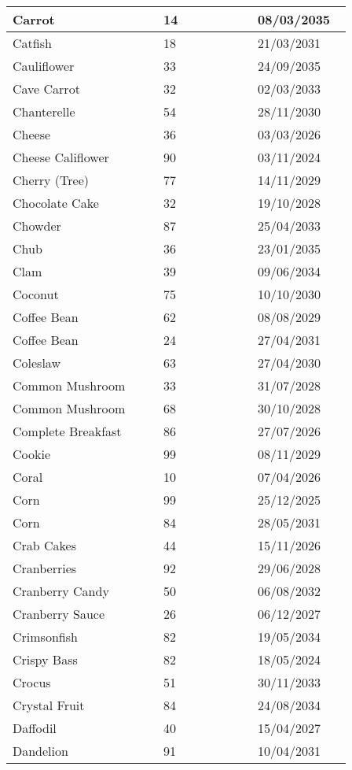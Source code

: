 \documentclass{article}
\begin{document}
\begin{longtable}{|p{0.4\linewidth}|p{0.25\linewidth}|p{0.25\linewidth}|}
\hline
Carrot & 14 & 08/03/2035 \\
\hline
Catfish & 18 & 21/03/2031 \\
\hline
Cauliflower & 33 & 24/09/2035 \\
\hline
Cave Carrot & 32 & 02/03/2033 \\
\hline
Chanterelle & 54 & 28/11/2030 \\
\hline
Cheese & 36 & 03/03/2026 \\
\hline
Cheese Califlower & 90 & 03/11/2024 \\
\hline
Cherry (Tree) & 77 & 14/11/2029 \\
\hline
Chocolate Cake & 32 & 19/10/2028 \\
\hline
Chowder & 87 & 25/04/2033 \\
\hline
Chub & 36 & 23/01/2035 \\
\hline
Clam & 39 & 09/06/2034 \\
\hline
Coconut & 75 & 10/10/2030 \\
\hline
Coffee Bean & 62 & 08/08/2029 \\
\hline
Coffee Bean & 24 & 27/04/2031 \\
\hline
Coleslaw & 63 & 27/04/2030 \\
\hline
Common Mushroom & 33 & 31/07/2028 \\
\hline
Common Mushroom & 68 & 30/10/2028 \\
\hline
Complete Breakfast & 86 & 27/07/2026 \\
\hline
Cookie & 99 & 08/11/2029 \\
\hline
Coral & 10 & 07/04/2026 \\
\hline
Corn & 99 & 25/12/2025 \\
\hline
Corn & 84 & 28/05/2031 \\
\hline
Crab Cakes & 44 & 15/11/2026 \\
\hline
Cranberries & 92 & 29/06/2028 \\
\hline
Cranberry Candy & 50 & 06/08/2032 \\
\hline
Cranberry Sauce & 26 & 06/12/2027 \\
\hline
Crimsonfish & 82 & 19/05/2034 \\
\hline
Crispy Bass & 82 & 18/05/2024 \\
\hline
Crocus & 51 & 30/11/2033 \\
\hline
Crystal Fruit & 84 & 24/08/2034 \\
\hline
Daffodil & 40 & 15/04/2027 \\
\hline
Dandelion & 91 & 10/04/2031 \\

\end{longtable}
\end{document}
